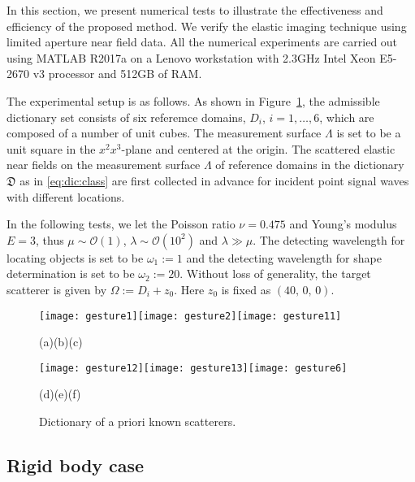\documentclass[a4paper,11pt]{article}
\newcommand{\mO}{\mathcal{O}}
\theoremstyle{remark}
\theoremstyle{definition}
\numberwithin{equation}{section}
\begin{document}
In this section, we present numerical tests to illustrate the effectiveness and efficiency of the proposed method.
We verify the elastic imaging technique using limited aperture near field data. %
All the numerical experiments are carried out using MATLAB R2017a on a
Lenovo workstation with 2.3GHz Intel Xeon E5-2670 v3 processor and 512GB of RAM.


The experimental setup is as follows.
As shown in Figure~\ref{fig:Dictionary}, the admissible dictionary set consists
of six referemce domains, $D_i$, $i=1,\ldots,6$, which are composed of a number of unit cubes.
The measurement surface $\Lambda$ is set to be a unit square in the $x^2 x^3$-plane and centered at the origin. The scattered elastic near fields on the measurement surface $\Lambda$ of reference domains
in the dictionary  $\mathfrak{D}$ as in \eqref{eq:dic:class} are first collected in advance for incident point signal waves with different locations.



In the following tests, we let the Poisson ratio $\nu=0.475$ and Young's modulus $E=3$, thus $\mu \sim \mO (1)$,  $\lambda \sim  \mO (10^2)$ and $\lambda \gg \mu$.
The detecting wavelength for locating objects is set
to be $\omega_{1}:=1$ and the detecting wavelength for shape determination
is set to be $\omega_{2}:=20$.
Without loss of generality, the target scatterer is given by $\Omega:=D_{i}+z_{0}$.
Here $z_{0}$ is fixed as $(40,\,0,\,0)$.


\begin{figure}
\hfill{}\texttt{[image: gesture1]}\hfill{}\texttt{[image: gesture2]}\hfill{}\texttt{[image: gesture11]}\hfill{}

\hfill{}(a)\hfill{}(b)\hfill{}(c)\hfill{}

\hfill{}\texttt{[image: gesture12]}\hfill{}\texttt{[image: gesture13]}\hfill{}\texttt{[image: gesture6]}\hfill{}

\hfill{}(d)\hfill{}(e)\hfill{}(f)\hfill{}

\caption{\label{fig:Dictionary}Dictionary of a priori known scatterers.}
\end{figure}


\subsection{Rigid body case}
\end{document}
